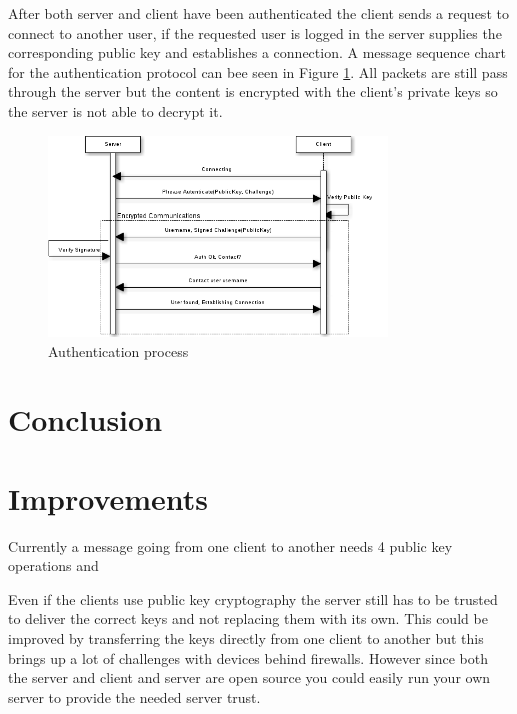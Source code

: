 \documentclass[twocolumn,11pt]{IEEEtran}
\begin{document}
After both server and client have been authenticated the client sends a request to connect to another user, if the requested user is logged in the server supplies the corresponding public key and establishes a connection. A message sequence chart for the authentication protocol can bee seen in Figure \ref{fig:auth}. All packets are still pass through the server but the content is encrypted with the client's private keys so the server is not able to decrypt it.



 

\begin{figure}
\label{fig:auth}
\centerline{
\includegraphics[width=90mm]{auth.png}}
\caption{Authentication process}
\end{figure}



\section {Conclusion}
\label{sec:conclusion}

\section {Improvements}
\label{sec:improve}
Currently a message going from one client to another needs 4 public key operations and 

Even if the clients use public key cryptography the server still has to be trusted to deliver the correct keys and not replacing them with its own. This could be improved by transferring the keys directly from one client to another but this brings up a lot of challenges with devices behind firewalls. However since both the server and client and server are open source you could easily run your own server to provide the needed server trust.

%
%
\end{document}

